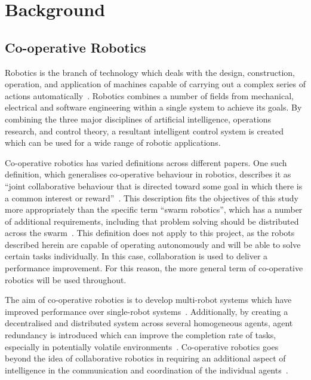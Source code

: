 
\chapter{Background}\label{litreview}

\section{Co-operative Robotics}\label{litreview/robotics}
Robotics is the branch of technology which deals with the design, construction, 
operation, and application of machines capable of carrying out a complex series of 
actions automatically~\cite{robotdef, roboticsdef}. Robotics 
combines a number of fields from mechanical,
electrical and software engineering within a single system to achieve its goals. By 
combining the three major disciplines of artificial intelligence, operations 
research, and control theory, a resultant intelligent control system is created~\cite{saridis1983intelligent} which can be 
used for a wide range of robotic applications.

Co-operative robotics has varied definitions across different papers. One such
definition, which generalises co-operative behaviour in robotics, describes it 
as ``joint collaborative behaviour that is directed toward some goal in which 
there is a common interest or reward''~\cite{barnes1991behaviour}. This 
description fits the objectives of this study more appropriately than the 
specific term ``swarm robotics'',  which has a number of additional requirements, 
including that problem solving should be distributed across the swarm~\cite{sahin04}. This definition does not apply to this project, as the robots 
described herein are capable of operating autonomously and will be able to solve 
certain tasks individually. In this case, collaboration is used to deliver a 
performance improvement. For this reason, the more general term of co-operative 
robotics will be used throughout. 

The aim of co-operative robotics is to  develop multi-robot systems which have improved performance over single-robot systems~\cite{premvuti1990consideration}. Additionally, by creating a decentralised and 
distributed system across several homogeneous agents, agent redundancy is 
introduced which can improve the completion rate of tasks, especially in 
potentially volatile environments~\cite{beckers1994local, parker95}.
Co-operative robotics goes beyond the idea of collaborative robotics in
requiring an additional aspect of intelligence in the communication and
coordination of the individual agents~\cite{cao1995cooperative}.

